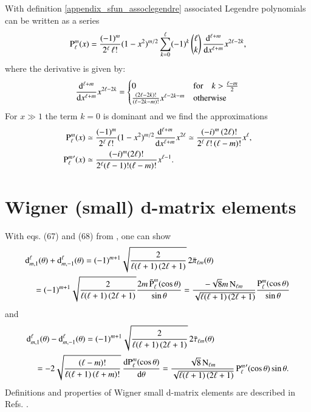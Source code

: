 With definition \eqref{appendix_sfun_assoclegendre}
associated Legendre polynomials can be written as a series
\begin{equation}
\label{appendix_sfun_assoclegendre_expl}
{\text{P}_{\ell}^{m}}(x) = \frac{(-1)^m}{2^\ell\,\ell!} (1-x^2)^{m/2} \sum_{k=0}^\ell (-1)^k \, \binom{\ell}{k} \, \frac{\mathrm{d}^{\ell+m}}{\mathrm{d}x^{\ell+m}} x^{2\ell-2k},
\end{equation}
where the derivative is given by:
\begin{equation}
\label{appendix_sfun_assoclegendre_deriv}
\frac{\mathrm{d}^{\ell+m}}{\mathrm{d}x^{\ell+m}} x^{2\ell-2k} =
\begin{cases}
0 & \text{for} \quad k>\frac{\ell-m}{2} \\
\frac{(2\ell-2k)!}{(\ell-2k-m)!} x^{\ell-2k-m}& \text{otherwise}
\end{cases} 
\end{equation}
For $x\gg 1$ the term $k=0$ is dominant and we find the approximations
\begin{align}
\label{eq:appendix_sfun_assoclegendre_plm_big}
{\text{P}_{\ell}^{m}}(x) &\simeq \frac{(-1)^m}{2^\ell\,\ell!} (1-x^2)^{m/2} \frac{\mathrm{d}^{\ell+m}}{\mathrm{d}x^{\ell+m}} x^{2\ell} \simeq \frac{ (-i)^m \, (2\ell)!}{2^\ell \, \ell! \, (\ell-m)!} x^\ell, \\
\label{eq:appendix_sfun_assoclegendre_dplm_big}
{\text{P}_{\ell}^{m}}^\prime(x) &\simeq \frac{ (-i)^m (2\ell)!}{2^\ell (\ell-1)! (\ell-m)!} x^{\ell-1}.
\end{align}


\section{Wigner (small) d-matrix elements}

With eqs. (67) and (68) from \cite{WignerDfunction}, one can show
\begin{align}
\nonumber
&\mathrm{d}^\ell_{m,1}(\theta) + \mathrm{d}^\ell_{m,-1}(\theta) = (-1)^{m+1} \sqrt{\frac{2}{\ell(\ell+1) \, (2\ell+1)}} \, 2\bar{\pi}_{\ell m}(\theta) \\
\label{eq:appendix_wignerdp}
&\quad= (-1)^{m+1} \sqrt{\frac{2}{\ell(\ell+1) \, (2\ell+1)}} \frac{2m \, {\bar{\text{P}}_{\ell}^{m}}(\cos\theta)}{\sin\theta} = \frac{-\sqrt{8}m \, \text{N}_{\ell m}}{\sqrt{\ell(\ell+1) \, (2\ell+1)}} \frac{{\text{P}_{\ell}^{m}}(\cos\theta)}{\sin\theta}
\end{align}
and
\begin{align}
\nonumber
&\mathrm{d}^\ell_{m,1}(\theta) - \mathrm{d}^\ell_{m,-1}(\theta) = (-1)^{m+1} \sqrt{\frac{2}{\ell(\ell+1) \, (2\ell+1)}} \, 2\bar{\tau}_{\ell m}(\theta) \\
\label{eq:appendix_wignerdm}
&\quad= -2 \sqrt{\frac{(\ell-m)!}{\ell(\ell+1) \, (\ell+m)!}} \, \frac{\mathrm{d}{\text{P}_{\ell}^{m}}(\cos\theta)}{\mathrm{d}\theta} = \frac{\sqrt{8} \, \text{N}_{\ell m}}{\sqrt{\ell(\ell+1) \, (2\ell+1)}} \, {\text{P}_{\ell}^{m}}^\prime(\cos\theta) \sin\theta.
\end{align}
Definitions and properties of Wigner small d-matrix elements are described in Refs. \cite{biedenharn, rose}.

